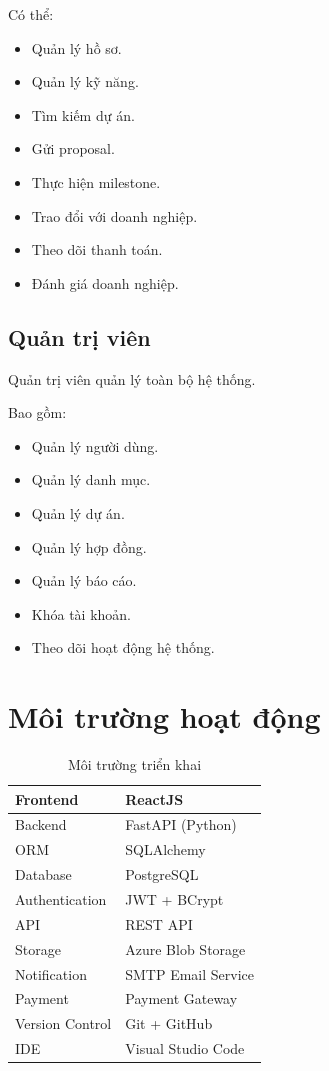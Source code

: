 Có thể:

\begin{itemize}
\item Quản lý hồ sơ.
\item Quản lý kỹ năng.
\item Tìm kiếm dự án.
\item Gửi proposal.
\item Thực hiện milestone.
\item Trao đổi với doanh nghiệp.
\item Theo dõi thanh toán.
\item Đánh giá doanh nghiệp.
\end{itemize}

\subsection{Quản trị viên}

Quản trị viên quản lý toàn bộ hệ thống.

Bao gồm:

\begin{itemize}
\item Quản lý người dùng.
\item Quản lý danh mục.
\item Quản lý dự án.
\item Quản lý hợp đồng.
\item Quản lý báo cáo.
\item Khóa tài khoản.
\item Theo dõi hoạt động hệ thống.
\end{itemize}

\section{Môi trường hoạt động}

\begin{table}[H]
\centering
\caption{Môi trường triển khai}
\begin{tabular}{|p{5cm}|p{9cm}|}
\hline
Frontend & ReactJS \\ \hline
Backend & FastAPI (Python) \\ \hline
ORM & SQLAlchemy \\ \hline
Database & PostgreSQL \\ \hline
Authentication & JWT + BCrypt \\ \hline
API & REST API \\ \hline
Storage & Azure Blob Storage \\ \hline
Notification & SMTP Email Service \\ \hline
Payment & Payment Gateway \\ \hline
Version Control & Git + GitHub \\ \hline
IDE & Visual Studio Code \\ \hline
\end{tabular}
\end{table}

